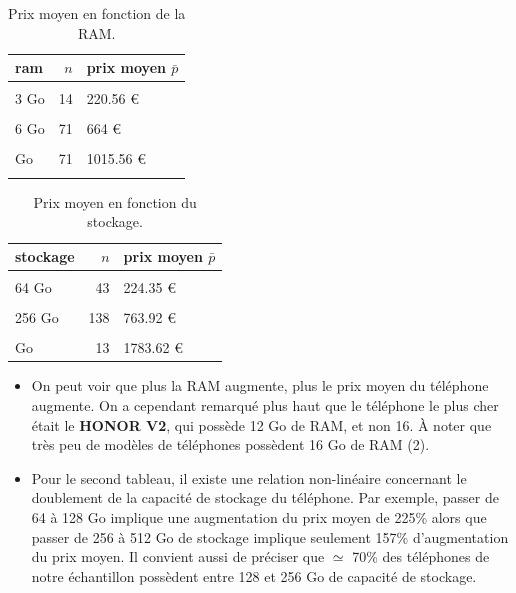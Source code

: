 \documentclass[
  12pt,
]{report}
\begin{document}
\begin{table}[!h]

\caption{\label{tab:kable_1}Prix moyen en fonction de la RAM.}
\centering
\begin{tabular}[t]{lrl}
\toprule
\textbf{ram} & \textbf{$n$} & \textbf{prix moyen $\bar p$}\\
\midrule
\cellcolor{gray!6}{2 Go} & \cellcolor{gray!6}{14} & \cellcolor{gray!6}{95.86 €}\\
3 Go & 14 & 220.56 €\\
\cellcolor{gray!6}{4 Go} & \cellcolor{gray!6}{105} & \cellcolor{gray!6}{402.31 €}\\
6 Go & 71 & 664 €\\
\cellcolor{gray!6}{8 Go} & \cellcolor{gray!6}{155} & \cellcolor{gray!6}{758.59 €}\\
\addlinespace
12 Go & 71 & 1015.56 €\\
\cellcolor{gray!6}{16 Go} & \cellcolor{gray!6}{2} & \cellcolor{gray!6}{1499 €}\\
\bottomrule
\end{tabular}
\end{table}

\begin{table}[!h]

\caption{\label{tab:kable_2}Prix moyen en fonction du stockage.}
\centering
\begin{tabular}[t]{lrl}
\toprule
\textbf{stockage} & \textbf{$n$} & \textbf{prix moyen $\bar p$}\\
\midrule
\cellcolor{gray!6}{32 Go} & \cellcolor{gray!6}{16} & \cellcolor{gray!6}{100.09 €}\\
64 Go & 43 & 224.35 €\\
\cellcolor{gray!6}{128 Go} & \cellcolor{gray!6}{173} & \cellcolor{gray!6}{507.96 €}\\
256 Go & 138 & 763.92 €\\
\cellcolor{gray!6}{512 Go} & \cellcolor{gray!6}{49} & \cellcolor{gray!6}{1199.34 €}\\
\addlinespace
1000 Go & 13 & 1783.62 €\\
\bottomrule
\end{tabular}
\end{table}

\begin{itemize}
\item
  On peut voir que plus la RAM augmente, plus le prix moyen du téléphone
  augmente. On a cependant remarqué plus haut que le téléphone le plus
  cher était le \textbf{HONOR V2}, qui possède 12 Go de RAM, et non 16.
  À noter que très peu de modèles de téléphones possèdent 16 Go de RAM
  (2).
\item
  Pour le second tableau, il existe une relation non-linéaire concernant
  le doublement de la capacité de stockage du téléphone. Par exemple,
  passer de 64 à 128 Go implique une augmentation du prix moyen de 225\%
  alors que passer de 256 à 512 Go de stockage implique seulement 157\%
  d'augmentation du prix moyen. Il convient aussi de préciser que
  \(\simeq\) 70\% des téléphones de notre échantillon possèdent entre
  128 et 256 Go de capacité de stockage.
\end{itemize}
\end{document}
